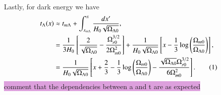 \documentclass{aa}
\newcommand\numberthis{\addtocounter{equation}{1}\tag{\theequation}}
\begin{document}
Lastly, for dark energy we have
\begin{align*}
  t_\Lambda(x) &\approx t_{m\Lambda} + \int_{x_{m\Lambda}}^{x}\frac{dx'}{H_0\sqrt{\Omega_{\Lambda0}}}, 
  \\
  &= \frac{1}{3H_0}\left[\frac{2}{\sqrt{\Omega_{\Lambda0}}} - \frac{\Omega_{r0}^{3/2}}{2\Omega^2_{m0}} \right] + \frac{1}{H_0\sqrt{\Omega_{\Lambda0}}}\left[x - \frac{1}{3}\log\left(\frac{\Omega_{m0}}{\Omega_{\Lambda0}}\right)\right],
  \\
  &= \frac{1}{H_0\sqrt{\Omega_{\Lambda0}}}\left[x+\frac{2}{3}-\frac{1}{3}\log\left(\frac{\Omega_{m0}}{\Omega_{\Lambda0}}\right)-\frac{\sqrt{\Omega_{\Lambda0}}\Omega_{r0}^{3/2}}{6\Omega^2_{m0}}\right]. \numberthis
\end{align*}
\colorbox{Plum}{comment that the dependencies between a and t are as expected}
\end{document}

